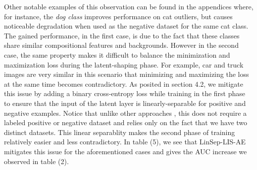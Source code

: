 \documentclass[acmtog, nonacm]{acmart}
\begin{document}
Other notable examples of this observation can be found in the appendices where, for instance, the \textit{dog class} improves performance on cat outliers, but causes noticeable degradation when used as the negative dataset for the same cat class. The gained performance, in the first case, is due to the fact that these classes share similar compositional features and backgrounds. However in the second case, the same property makes it difficult to balance the minimization and maximization loss during the latent-shaping phase. For example, car and truck images are very similar in this scenario that minimizing and maximizing the loss at the same time becomes contradictory. As posited in section 4.2, we mitigate this issue by adding a binary cross-entropy loss while training in the first phase to ensure that the input of the latent layer is linearly-separable for positive and negative examples. Notice that unlike other approaches \cite{hendrycks2018deep, perera2019learning}, this does not require a labeled positive or negative dataset and relies only on the fact that we have two distinct datasets. This linear separablity makes the second phase of training relatively easier and less contradictory. In table (5), we see that LinSep-LIS-AE mitigates this issue for the aforementioned cases and gives the AUC increase we observed in table (2).


















\noindent
\end{document}
